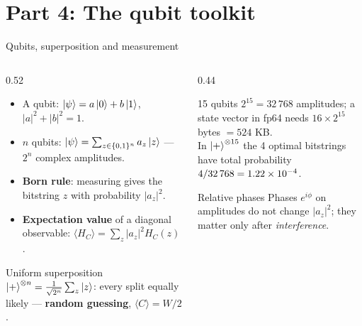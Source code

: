 \documentclass[aspectratio=169,11pt]{beamer}
\newcommand{\key}[1]{{\color{qdark}\textbf{#1}}}
\begin{document}
\section{Part 4: The qubit toolkit}
\begin{frame}{Qubits, superposition and measurement}
  \begin{columns}[T]
    \begin{column}{0.52\textwidth}
      \begin{itemize}
        \item A qubit: $\ket\psi = a\ket0 + b\ket1$, $|a|^2 + |b|^2 = 1$.
        \item $n$ qubits: $\ket\psi = \sum_{z\in\{0,1\}^n} a_z\ket z$ --- $2^n$ complex amplitudes.
        \item \key{Born rule}: measuring gives the bitstring $z$ with probability $|a_z|^2$.
        \item \key{Expectation value} of a diagonal observable: $\langle H_C\rangle = \sum_z |a_z|^2 H_C(z)$.
      \end{itemize}
      \begin{block}{Uniform superposition}
        $\ket+^{\otimes n} = \frac{1}{\sqrt{2^n}}\sum_z\ket z$: every split equally likely --- \key{random guessing},
        $\langle C\rangle = W/2$.
      \end{block}
    \end{column}
    \begin{column}{0.44\textwidth}
      \begin{exampleblock}{15 qubits}
        $2^{15} = 32\,768$ amplitudes; a state vector in fp64 needs $16\times2^{15}$ bytes $= 524$ KB.\\[1mm]
        In $\ket+^{\otimes15}$ the 4 optimal bitstrings have total probability $4/32\,768 = 1.22\times10^{-4}$.
      \end{exampleblock}
      \begin{alertblock}{Relative phases}
        Phases $e^{i\phi}$ on amplitudes do not change $|a_z|^2$; they matter only after \emph{interference}.
      \end{alertblock}
    \end{column}
  \end{columns}
\end{frame}
\end{document}
